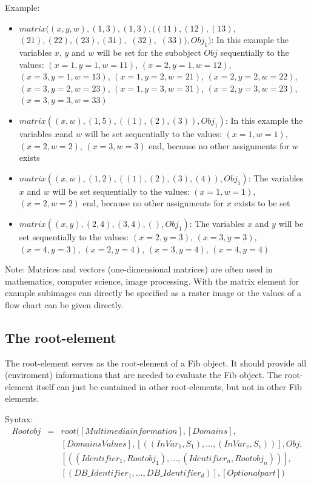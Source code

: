 \bigskip\noindent
Example:
\begin{itemize}
 \item $matrix( (x, y, w), (1, 3), ( 1, 3), ( (11), (12), (13),$ $ (21), (22), (23), (31),$ $(32),$ $(33) ), Obj_1)$: In this example the variables $x$, $y$ and $w$ will be set for the subobject $Obj$ sequentially to the values: $( x=1, y=1, w=11)$, $( x=2, y=1, w=12)$, $( x=3, y=1, w=13)$, $( x=1, y=2, w=21)$, $( x=2, y=2, w=22)$, $( x=3, y=2, w=23)$, $( x=1, y=3, w=31)$, $( x=2, y=3, w=23)$, $( x=3, y=3, w=33)$
 \item $matrix( (x, w), (1, 5), ( (1), (2), (3) ), Obj_1)$: In this example the variables $x$and $w$ will be set sequentially to the values: $( x=1, w=1)$, $( x=2, w=2)$, $( x=3, w=3)$ end, because no other assignments for $w$ exists
 \item $matrix( (x, w), (1, 2), ( (1), (2), (3), (4) ), Obj_1)$: The variables $x$ and $w$ will be set sequentially to the values: $( x=1, w=1)$, $( x=2, w=2)$ end, because no other assignments for $x$ exists to be set
 \item $matrix( (x, y), (2,4), (3,4), ( ), Obj_1)$: The variables $x$ and $y$ will be set sequentially to the values: $( x=2, y=3)$, $( x=3, y=3)$, $( x=4, y=3)$, $( x=2, y=4)$, $( x=3, y=4)$, $( x=4, y=4)$
\end{itemize}

\bigskip\noindent
Note:
Matrices and vectors (one-dimensional matrices) are often used in mathematics, computer science, image processing. With the matrix element for example subimages can directly be specified as a raster image or the values of a flow chart can be given directly.



\subsection{The root-element}
\label{fibRootElement}

The root-element serves as the root-element of a Fib object. It should provide all (enviroment) informations that are needed to evaluate the Fib object. The root-element itself can just be contained in other root-elements, but not in other Fib elements.

\bigskip\noindent
Syntax:
\begin{eqnarray*}
Rootobj &=& root( [Multimediainformation], [Domains], \\
&& [DomainsValues], [((InVar_1, S_1), \ldots , (InVar_v, S_v) )],  Obj ,\\
&& [((Identifier_1, Rootobj_1) , \ldots , (Identifier_n, Rootobj_n))],\\
&& [( DB\_Identifier_1, \ldots , DB\_Identifier_d)], [Optionalpart] )
\end{eqnarray*}

